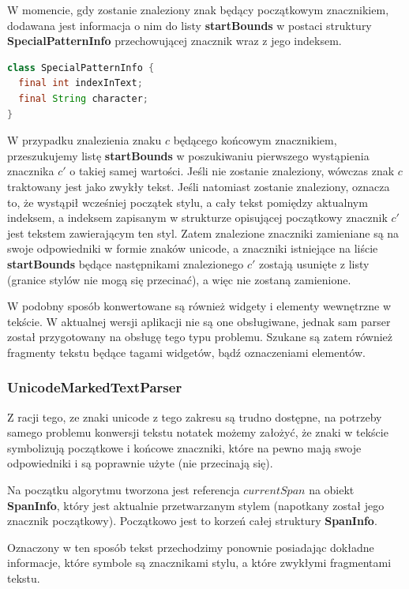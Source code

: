 W momencie, gdy zostanie znaleziony znak będący początkowym znacznikiem, dodawana jest informacja o nim do listy \textbf{startBounds} w postaci struktury \textbf{SpecialPatternInfo} przechowującej znacznik wraz z jego indeksem.

\begin{lstlisting}[language=Java]
class SpecialPatternInfo {
  final int indexInText;
  final String character;
}
\end{lstlisting}

W przypadku znalezienia znaku $c$ będącego końcowym znacznikiem, przeszukujemy listę \textbf{startBounds} w poszukiwaniu pierwszego wystąpienia znacznika $c'$ o takiej samej wartości. Jeśli nie zostanie znaleziony, wówczas znak $c$ traktowany jest jako zwykły tekst. Jeśli natomiast zostanie znaleziony, oznacza to, że wystąpił wcześniej początek stylu, a cały tekst pomiędzy aktualnym indeksem, a indeksem zapisanym w strukturze opisującej początkowy znacznik $c'$ jest tekstem zawierającym ten styl. Zatem znalezione znaczniki zamieniane są na swoje odpowiedniki w formie znaków unicode, a znaczniki istniejące na liście \textbf{startBounds} będące następnikami znalezionego $c'$ zostają usunięte z listy (granice stylów nie mogą się przecinać), a więc nie zostaną zamienione.

W podobny sposób konwertowane są również widgety i elementy wewnętrzne w tekście. W aktualnej wersji aplikacji nie są one obsługiwane, jednak sam parser został przygotowany na obsługę tego typu problemu. Szukane są zatem również fragmenty tekstu będące tagami widgetów, bądź oznaczeniami elementów.

\subsubsection{UnicodeMarkedTextParser}

Z racji tego, ze znaki unicode z tego zakresu są trudno dostępne, na potrzeby samego problemu konwersji tekstu notatek możemy założyć, że znaki w tekście symbolizują początkowe i końcowe znaczniki, które na pewno mają swoje odpowiedniki i są poprawnie użyte (nie przecinają się).

Na początku algorytmu tworzona jest referencja $currentSpan$ na obiekt \textbf{SpanInfo}, który jest aktualnie przetwarzanym stylem (napotkany został jego znacznik początkowy). Początkowo jest to korzeń całej struktury \textbf{SpanInfo}.

Oznaczony w ten sposób tekst przechodzimy ponownie posiadając dokładne informacje, które symbole są znacznikami stylu, a które zwykłymi fragmentami tekstu.

